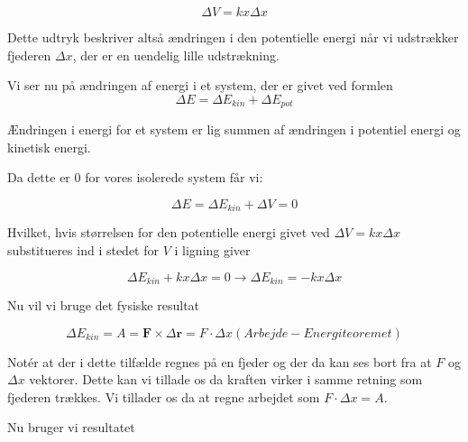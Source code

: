 \begin{equation}
\Delta V = kx \Delta x
\end{equation} 

\bigskip

Dette udtryk beskriver altså ændringen i den potentielle energi når vi udstrækker fjederen $\Delta x$, der er en uendelig lille udstrækning. 

\bigskip

Vi ser nu på ændringen af energi i et system, der er givet ved formlen 
\begin{equation}
\Delta E = \Delta E_{kin} + \Delta E_{pot}
\end{equation}

\bigskip

Ændringen i energi for et system er lig summen af ændringen i potentiel energi og kinetisk energi. 

Da dette er 0 for vores isolerede system får vi: 

\bigskip

\begin{equation}
\Delta E = \Delta E_{kin} + \Delta V = 0
\end{equation}

\bigskip

Hvilket, hvis størrelsen for den potentielle energi givet ved $\Delta V = kx \Delta x$ substitueres ind i stedet for $V$ i ligning  giver

\bigskip

\begin{equation}
\Delta E_{kin} + kx \Delta x = 0 \rightarrow \Delta E_{kin} = -kx \Delta x
\end{equation}

\bigskip

Nu vil vi bruge det fysiske resultat

\bigskip

\begin{equation}
\Delta E_{kin} = A = \textbf{F} \times \Delta \textbf{r} = F \cdot \Delta x (Arbejde-Energi teoremet)
\end{equation}

\bigskip

Notér at der i dette tilfælde regnes på en fjeder og der da kan ses bort fra at $F$ og $\Delta x$ vektorer. Dette kan vi tillade os da kraften virker i samme retning som fjederen trækkes. Vi tillader os da at regne arbejdet som $F \cdot \Delta x = A$.

Nu bruger vi resultatet 

